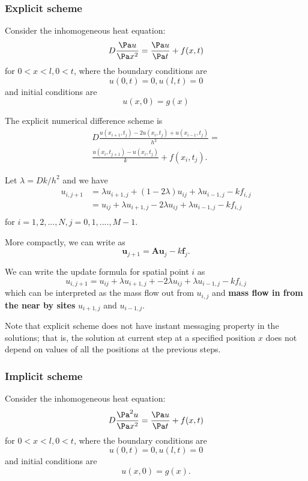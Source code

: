 \begin{refsection}
\subsubsection{Explicit scheme}
\begin{definition}
Consider the inhomogeneous heat equation:
$$D\frac{\Pa u}{\Pa x^2} = \frac{\Pa u}{\Pa t} + f(x,t)$$
for $0<x<l,0<t$, where the boundary conditions are
$$u(0,t)=0,u(l,t)=0$$ and initial conditions are
$$u(x,0) =g(x)$$

The explicit numerical difference scheme is
\begin{align*}
D\frac{u(x_{i+1},t_j) - 2u(x_i,t_j) + u(x_{i-1},t_j)}{h^2}  =\\ \frac{u(x_i,t_{j+1})-u(x_i,t_{j})}{k} + f(x_i,t_j).    
\end{align*}

Let $\lambda = Dk/h^2$ and we have
\begin{align*}
u_{i,j+1} &= \lambda u_{i+1,j} + (1-2\lambda) u_{ij} + \lambda u_{i-1,j} - kf_{i,j} \\
		  &= u_{ij} + \lambda u_{i+1,j} - 2\lambda u_{ij} + \lambda u_{i-1,j} - kf_{i,j} \\
\end{align*}
for $i=1,2,...,N,j=0,1,....,M-1$.

More compactly, we can write as
$$\bm{u}_{j+1} = \bm{Au}_j - k\bm{f}_j.$$
\end{definition}


\begin{remark}
We can write the update formula for spatial point $i$ as
$$u_{i,j+1} = u_{ij} + \lambda u_{i+1,j} + -2\lambda u_{ij} + \lambda u_{i-1,j} - kf_{i,j} $$
which can be interpreted as the mass flow out from $u_{i,j}$ and \textbf{mass flow in from the near by sites}  $u_{i+1,j}$ and $u_{i-1,j}$.
\end{remark}

\begin{remark}
Note that explicit scheme does not have instant messaging property in the solutions; that is, the solution at current step at a specified position $x$ does not depend on values of all the positions at the previous steps.
\end{remark}


\subsubsection{Implicit scheme}
\begin{definition}
\cite[101]{holmes2007introduction}
Consider the inhomogeneous heat equation:
$$D\frac{\Pa^2 u}{\Pa x^2} = \frac{\Pa u}{\Pa t} + f(x,t)$$
for $0<x<l,0<t$, where the boundary conditions are
$$u(0,t)=0,u(l,t)=0$$ and initial conditions are
$$u(x,0) =g(x).$$


\end{definition}
\end{refsection}
